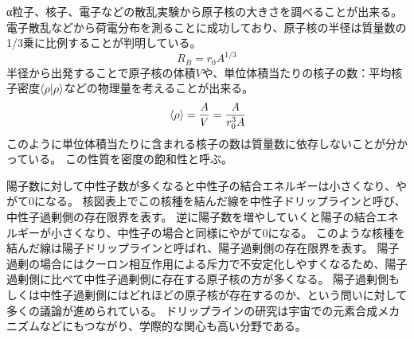 \documentclass[12pt]{jarticle}
\begin{document}
α粒子、核子、電子などの散乱実験から原子核の大きさを調べることが出来る。
電子散乱などから荷電分布を測ることに成功しており、原子核の半径は質量数の1/3乗に比例することが判明している。
\[
    R_B = r_0 A^{1/3} 
\]
半径から出発することで原子核の体積$V$や、単位体積当たりの核子の数：平均核子密度$\braket{\rho}$などの物理量を考えることが出来る。
\begin{equation}
    \ev*{\rho} = \frac{A}{V} = \frac{A}{r_0^{3}A}
\end{equation}
このように単位体積当たりに含まれる核子の数は質量数に依存しないことが分かっている。
この性質を密度の飽和性と呼ぶ。

陽子数に対して中性子数が多くなると中性子の結合エネルギーは小さくなり、やがて0になる。
核図表上でこの核種を結んだ線を中性子ドリップラインと呼び、中性子過剰側の存在限界を表す。
逆に陽子数を増やしていくと陽子の結合エネルギーが小さくなり、中性子の場合と同様にやがて0になる。
このような核種を結んだ線は陽子ドリップラインと呼ばれ、陽子過剰側の存在限界を表す。
陽子過剰の場合にはクーロン相互作用による斥力で不安定化しやすくなるため、陽子過剰側に比べて中性子過剰側に存在する原子核の方が多くなる。
陽子過剰側もしくは中性子過剰側にはどれほどの原子核が存在するのか、という問いに対して多くの議論が進められている。
ドリップラインの研究は宇宙での元素合成メカニズムなどにもつながり、学際的な関心も高い分野である。

%
\end{document}
